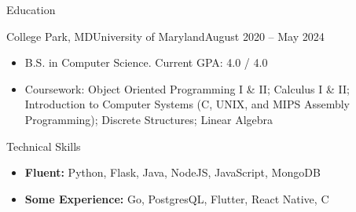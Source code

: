 \documentclass[]{mcdowellcv}
\begin{document}
	\makeheader
	
	\begin{cvsection}{Education}
		\begin{cvsubsection}{College Park, MD}{University of Maryland}{August 2020 -- May 2024}
			\begin{itemize}
				\item B.S. in Computer Science. Current GPA: 4.0 / 4.0
				\item Coursework: Object Oriented Programming I \& II; Calculus I \& II; Introduction to Computer Systems (C, UNIX, and MIPS Assembly Programming); Discrete Structures; Linear Algebra
			\end{itemize}
		\end{cvsubsection}
	\end{cvsection}

	\begin{cvsection}{Technical Skills}
		\begin{cvsubsection}{}{}{}
			\vspace{0.5em}
			\begin{itemize}
				\item \textbf{Fluent:} Python, Flask, Java, NodeJS, JavaScript, MongoDB
				\item \textbf{Some Experience:} Go, PostgresQL, Flutter, React Native, C
			\end{itemize}		
		\end{cvsubsection}
	\end{cvsection}
\end{document}
